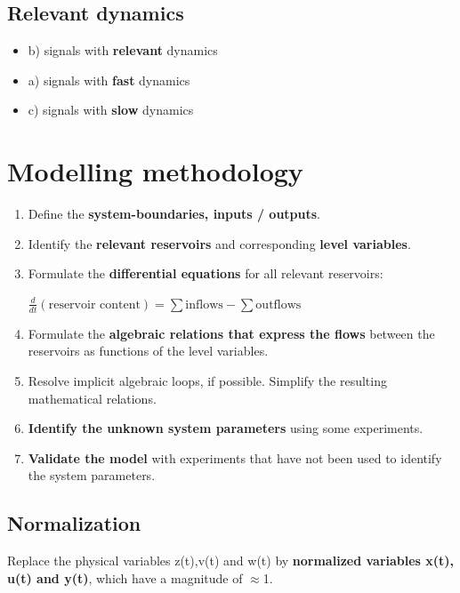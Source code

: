 \documentclass[10pt,a4paper]{scrartcl}
\begin{document}
\begin{multicols*}{3}
\columnbreak

\subsection{Relevant dynamics}


\begin{itemize}
\compaq
\item b) signals with \textbf{relevant} dynamics
\item a) signals with \textbf{fast} dynamics
\item c) signals with \textbf{slow} dynamics
\end{itemize}

\vfill
\null
\columnbreak

\section{Modelling methodology}

\begin{enumerate}
\item Define the \textbf{system-boundaries, inputs / outputs}.
\item Identify the \textbf{relevant reservoirs} and corresponding \textbf{level variables}.

\item Formulate the \textbf{differential equations} for all relevant reservoirs:

$\frac{d}{dt}(\text{reservoir content})=\sum\text{inflows}-\sum\text{outflows}$
\item Formulate the \textbf{algebraic relations that express the flows} between the reservoirs as functions of the level variables.
\item Resolve implicit algebraic loops, if possible. Simplify the resulting mathematical relations.
\item \textbf{Identify the unknown system parameters} using some experiments.
\item \textbf{Validate the model} with experiments that have not been used to identify the system parameters.
\end{enumerate}

\subsection{Normalization}
	Replace the physical variables z(t),v(t) and w(t) by \textbf{normalized variables x(t), u(t) and y(t)}, which have a magnitude of $\approx$1.
	

\end{multicols*}
\end{document}
